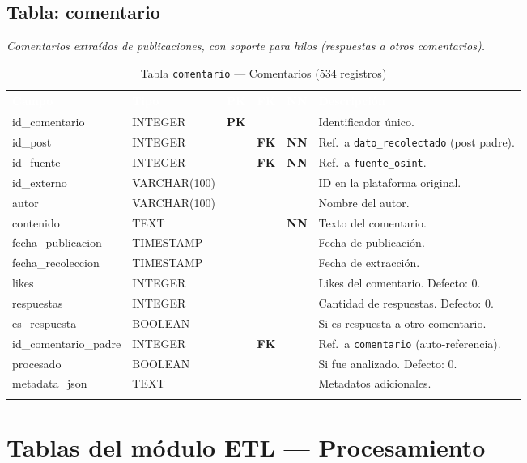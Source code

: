 \documentclass[11pt,a4paper]{article}
\newcommand{\tableheadrow}{\rowcolor{tableheader}}
\newcommand{\tablehead}[1]{\textcolor{white}{\textbf{#1}}}
\newcommand{\pk}{\textcolor{emiblue}{\textbf{PK}}}
\newcommand{\fk}{\textcolor{orange!80!black}{\textbf{FK}}}
\newcommand{\nn}{\textcolor{red!70!black}{\textbf{NN}}}
\begin{document}
\subsection{Tabla: comentario}
\textit{Comentarios extraídos de publicaciones, con soporte para hilos (respuestas a otros comentarios).}

\begin{longtable}{p{4.2cm} p{2.8cm} c c c p{4.5cm}}
\toprule
\tableheadrow
\tablehead{Campo} & \tablehead{Tipo} & \tablehead{PK} & \tablehead{FK} & \tablehead{NN} & \tablehead{Descripción} \\
\midrule
\endhead
id\_comentario & INTEGER & \pk & & & Identificador único. \\
\rowcolor{tablerow}
id\_post & INTEGER & & \fk & \nn & Ref.\ a \texttt{dato\_recolectado} (post padre). \\
id\_fuente & INTEGER & & \fk & \nn & Ref.\ a \texttt{fuente\_osint}. \\
\rowcolor{tablerow}
id\_externo & VARCHAR(100) & & & & ID en la plataforma original. \\
autor & VARCHAR(100) & & & & Nombre del autor. \\
\rowcolor{tablerow}
contenido & TEXT & & & \nn & Texto del comentario. \\
fecha\_publicacion & TIMESTAMP & & & & Fecha de publicación. \\
\rowcolor{tablerow}
fecha\_recoleccion & TIMESTAMP & & & & Fecha de extracción. \\
likes & INTEGER & & & & Likes del comentario. Defecto: 0. \\
\rowcolor{tablerow}
respuestas & INTEGER & & & & Cantidad de respuestas. Defecto: 0. \\
es\_respuesta & BOOLEAN & & & & Si es respuesta a otro comentario. \\
\rowcolor{tablerow}
id\_comentario\_padre & INTEGER & & \fk & & Ref.\ a \texttt{comentario} (auto-referencia). \\
procesado & BOOLEAN & & & & Si fue analizado. Defecto: 0. \\
\rowcolor{tablerow}
metadata\_json & TEXT & & & & Metadatos adicionales. \\
\bottomrule
\caption{Tabla \texttt{comentario} — Comentarios (534 registros)}
\end{longtable}

\section{Tablas del módulo ETL — Procesamiento}
\end{document}
